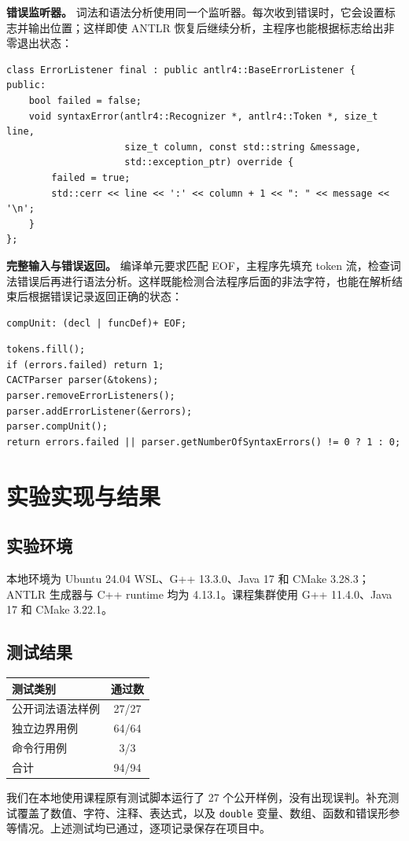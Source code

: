 \documentclass[UTF8,a4paper,11pt]{ctexart}
\begin{document}
\textbf{错误监听器。} 词法和语法分析使用同一个监听器。每次收到错误时，它会设置标志并输出位置；这样即使 ANTLR 恢复后继续分析，主程序也能根据标志给出非零退出状态：
\begin{lstlisting}
class ErrorListener final : public antlr4::BaseErrorListener {
public:
    bool failed = false;
    void syntaxError(antlr4::Recognizer *, antlr4::Token *, size_t line,
                     size_t column, const std::string &message,
                     std::exception_ptr) override {
        failed = true;
        std::cerr << line << ':' << column + 1 << ": " << message << '\n';
    }
};
\end{lstlisting}

\textbf{完整输入与错误返回。} 编译单元要求匹配 EOF，主程序先填充 token 流，检查词法错误后再进行语法分析。这样既能检测合法程序后面的非法字符，也能在解析结束后根据错误记录返回正确的状态：
\begin{lstlisting}
compUnit: (decl | funcDef)+ EOF;
\end{lstlisting}
\begin{lstlisting}
tokens.fill();
if (errors.failed) return 1;
CACTParser parser(&tokens);
parser.removeErrorListeners();
parser.addErrorListener(&errors);
parser.compUnit();
return errors.failed || parser.getNumberOfSyntaxErrors() != 0 ? 1 : 0;
\end{lstlisting}

\section{实验实现与结果}
\subsection{实验环境}
本地环境为 Ubuntu 24.04 WSL、G++ 13.3.0、Java 17 和 CMake 3.28.3；ANTLR 生成器与 C++ runtime 均为 4.13.1。课程集群使用 G++ 11.4.0、Java 17 和 CMake 3.22.1。

\subsection{测试结果}
\begin{center}
\begin{tabular}{lc}
\toprule
测试类别 & 通过数\\
\midrule
公开词法语法样例 & 27/27\\
独立边界用例 & 64/64\\
命令行用例 & 3/3\\
\midrule
合计 & 94/94\\
\bottomrule
\end{tabular}
\end{center}
我们在本地使用课程原有测试脚本运行了 27 个公开样例，没有出现误判。补充测试覆盖了数值、字符、注释、表达式，以及 \texttt{double} 变量、数组、函数和错误形参等情况。上述测试均已通过，逐项记录保存在项目中。
\end{document}
